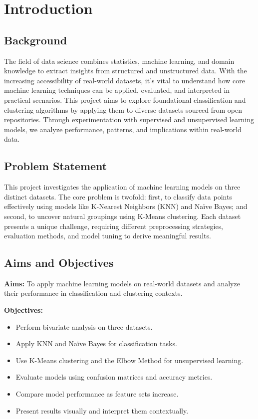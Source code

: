 \chapter{Introduction}
\label{ch:into}

\section{Background}
\label{sec:into_back}

The field of data science combines statistics, machine learning, and domain knowledge to extract insights from structured and unstructured data. With the increasing accessibility of real-world datasets, it's vital to understand how core machine learning techniques can be applied, evaluated, and interpreted in practical scenarios. This project aims to explore foundational classification and clustering algorithms by applying them to diverse datasets sourced from open repositories. Through experimentation with supervised and unsupervised learning models, we analyze performance, patterns, and implications within real-world data.

\section{Problem Statement}
\label{sec:intro_prob_art}

This project investigates the application of machine learning models on three distinct datasets. The core problem is twofold: first, to classify data points effectively using models like K-Nearest Neighbors (KNN) and Naïve Bayes; and second, to uncover natural groupings using K-Means clustering. Each dataset presents a unique challenge, requiring different preprocessing strategies, evaluation methods, and model tuning to derive meaningful results.

\section{Aims and Objectives}
\label{sec:intro_aims_obj}

\textbf{Aims:}
To apply machine learning models on real-world datasets and analyze their performance in classification and clustering contexts.

\textbf{Objectives:}
\begin{itemize}
    \item Perform bivariate analysis on three datasets.
    \item Apply KNN and Naïve Bayes for classification tasks.
    \item Use K-Means clustering and the Elbow Method for unsupervised learning.
    \item Evaluate models using confusion matrices and accuracy metrics.
    \item Compare model performance as feature sets increase.
    \item Present results visually and interpret them contextually.
\end{itemize}

